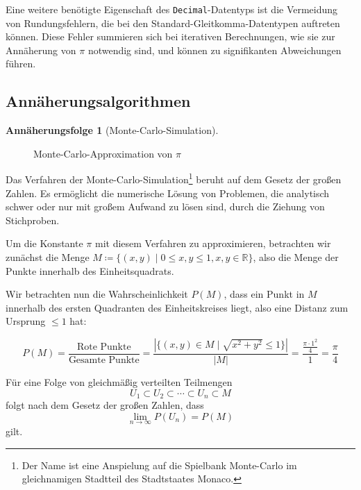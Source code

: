 \documentclass{scrartcl}
\theoremstyle{definition}
\newtheorem{approximation sequence}{Annäherungsfolge}
\begin{document}
Eine weitere benötigte Eigenschaft des \texttt{Decimal}-Datentyps ist die
Vermeidung von Rundungsfehlern, die bei den Standard-Gleitkomma-Datentypen
auftreten können. Diese Fehler summieren sich bei iterativen Berechnungen, wie
sie zur Annäherung von \(\pi\) notwendig sind, und können zu signifikanten
Abweichungen führen.

\subsection{Annäherungsalgorithmen}

\begin{approximation sequence}[Monte-Carlo-Simulation]~\\[12pt]
\begin{figure}[H]
    \centering
    
    \caption{Monte-Carlo-Approximation von \(\pi\)}
    \label{fig:monte-carlo-approximation}
\end{figure}

Das Verfahren der Monte-Carlo-Simulation\footnote{Der Name ist eine Anspielung
auf die Spielbank Monte-Carlo im gleichnamigen Stadtteil des Stadtstaates
Monaco.\cite{anderson:1986:metropolis}} beruht auf dem Gesetz der großen
Zahlen. Es ermöglicht die numerische Lösung von Problemen, die analytisch
schwer oder nur mit großem Aufwand zu lösen sind, durch die Ziehung von
Stichproben.

Um die Konstante \(\pi\) mit diesem Verfahren zu approximieren, betrachten wir
zunächst die Menge \(M \coloneq \{(x, y) \mid 0 \le x,y \le 1, x, y \in
\mathbb{R}\}\), also die Menge der Punkte innerhalb des Einheitsquadrats.

Wir betrachten nun die Wahrscheinlichkeit \(P(M)\), dass ein Punkt in \(M\)
innerhalb des ersten Quadranten des Einheitskreises liegt, also eine Distanz
zum Ursprung \(\le 1\) hat:

\begin{equation}
    P(M)
    = \frac{\text{Rote Punkte}}{\text{Gesamte Punkte}}
    = \frac{|\{(x, y) \in M \mid \sqrt{x^2 + y^2} \le 1\}|}{|M|}
    = \frac{\frac{\pi \cdot 1^2}{4}}{1} = \frac{\pi}{4}
\end{equation}

Für eine Folge von gleichmäßig verteilten Teilmengen
\begin{equation}
    U_1 \subset U_2 \subset \cdots \subset U_n \subset M
\end{equation}
folgt nach dem Gesetz der großen Zahlen, dass
\begin{equation}
    \lim_{n \to \infty} P(U_n) = P(M)
\end{equation}
gilt.


\end{approximation sequence}
\end{document}

